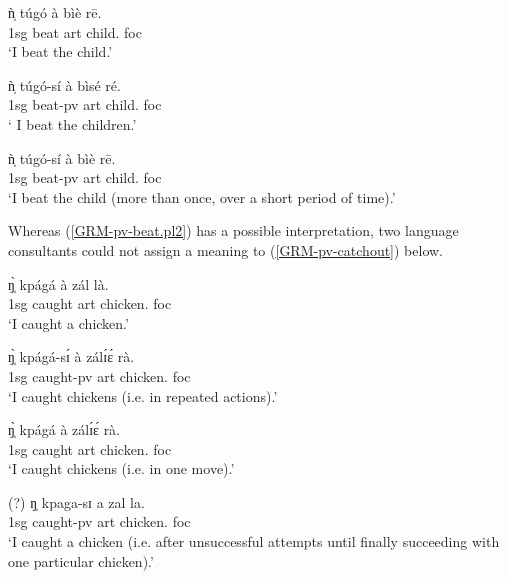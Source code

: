 \begin{exe}
\begin{exe}
\begin{exe}
\begin{exe}
\begin{exe}
\begin{exe}
\begin{exe}
\begin{exe}
\begin{exe}
\begin{exe}
\begin{exe}
\begin{exe}
\ea\label{GRM-pv-beat}
  
 \ea\label{GRM-pv-beat.sg}
\gll   ǹ̩   túgó  à bìè  rē.\\
   {\sc 1sg}  {beat} {\sc art} {child.\sg} {\sc foc}\\
\glt `I beat the child.'

\ex\label{GRM-pv-beat.pl1}
\gll   ǹ̩ túgó-sí  à bìsé  ré.\\
   {\sc 1sg}   {beat-{\sc pv}} {\sc art} {child.\pl} {\sc foc}\\
\glt ` I beat the children.'


\ex\label{GRM-pv-beat.pl2}
\gll  ǹ̩ túgó-sí  à  bìè  rē.\\
   {\sc 1sg} {beat-{\sc pv}} {\sc art}  {child.\sg} {\sc foc} \\
\glt `I beat the child (more than once, over a short period of time).'

\z 
 \z

Whereas  (\ref{GRM-pv-beat.pl2}) has a possible interpretation, two language consultants could not assign a meaning to (\ref{GRM-pv-catchout}) below. 

\ea\label{GRM-pv-catch}
  
 \ea\label{GRM-pv-catchsg}
\gll ŋ̩̀  kpágá  à  zál  là.\\
   {\sc 1sg}   {caught} {\sc art} {chicken.\sg} {\sc foc}\\
\glt `I caught a chicken.'

 \ex\label{GRM-pv-catchpl1}
\gll ŋ̩̀ kpágá-sɪ́  à  zálɪ́ɛ́ rà.\\
    {\sc 1sg} {caught-{\sc pv}} {\sc art} {chicken.\pl} {\sc foc}\\
\glt `I caught chickens (i.e. in repeated actions).'


 \ex\label{GRM-pv-catchpl2}
\gll   ŋ̩̀  kpágá  à  zálɪ́ɛ́ rà.\\
    {\sc 1sg}  {caught} {\sc art} {chicken.\pl} {\sc foc}\\
\glt `I caught chickens (i.e. in one move).'

 \ex\label{GRM-pv-catchout}
\gll (?)  ŋ̩  kpaga-sɪ  a  zal  la.\\
  {}   {\sc 1sg}  {caught-{\sc pv}} {\sc art} {chicken.\sg} {\sc foc}\\
\glt `I caught a chicken (i.e. after unsuccessful attempts until finally succeeding with one particular chicken).'

\z 
 \z


\end{exe}
\end{exe}
\end{exe}
\end{exe}
\end{exe}
\end{exe}
\end{exe}
\end{exe}
\end{exe}
\end{exe}
\end{exe}
\end{exe}
